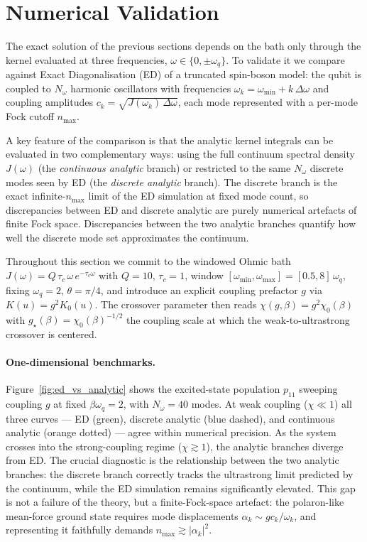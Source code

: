 \section{Numerical Validation}
\label{sec:numerical_results_v2}

The exact solution of the previous sections depends on the bath only through
the kernel evaluated at three frequencies, $\omega \in \{0, \pm\omega_q\}$.
To validate it we compare against Exact Diagonalisation (ED) of a truncated
spin-boson model: the qubit is coupled to $N_\omega$ harmonic oscillators with
frequencies $\omega_k = \omega_{\min} + k\,\Delta\omega$ and coupling amplitudes
$c_k = \sqrt{J(\omega_k)\,\Delta\omega}$, each mode represented with a per-mode
Fock cutoff $n_{\max}$.

A key feature of the comparison is that the analytic kernel integrals can be
evaluated in two complementary ways: using the full continuum spectral density
$J(\omega)$ (the \emph{continuous analytic} branch) or restricted to the same
$N_\omega$ discrete modes seen by ED (the \emph{discrete analytic} branch).
The discrete branch is the exact infinite-$n_{\max}$ limit of the ED simulation
at fixed mode count, so discrepancies between ED and discrete analytic are
purely numerical artefacts of finite Fock space.  Discrepancies between the
two analytic branches quantify how well the discrete mode set approximates the
continuum.

Throughout this section we commit to the windowed Ohmic bath
$J(\omega) = Q\,\tau_c\,\omega\,e^{-\tau_c\omega}$ with $Q=10$, $\tau_c=1$,
window $[\omega_{\min}, \omega_{\max}] = [0.5, 8]\,\omega_q$, fixing
$\omega_q = 2$, $\theta = \pi/4$, and introduce an explicit coupling
prefactor $g$ via $K(u) = g^2 K_0(u)$.  The crossover parameter then reads
$\chi(g,\beta) = g^2\chi_0(\beta)$ with
$g_\star(\beta) = \chi_0(\beta)^{-1/2}$ the coupling scale at which the
weak-to-ultrastrong crossover is centered.

\paragraph{One-dimensional benchmarks.}

Figure~\ref{fig:ed_vs_analytic} shows the excited-state population $p_{11}$
sweeping coupling $g$ at fixed $\beta\omega_q = 2$, with $N_\omega = 40$ modes.
At weak coupling ($\chi \ll 1$) all three curves — ED (green), discrete analytic
(blue dashed), and continuous analytic (orange dotted) — agree within numerical
precision.  As the system crosses into the strong-coupling regime ($\chi \gtrsim 1$),
the analytic branches diverge from ED.  The crucial diagnostic is the
relationship between the two analytic branches: the discrete branch correctly
tracks the ultrastrong limit predicted by the continuum, while the ED simulation
remains significantly elevated.  This gap is not a failure of the theory, but
a finite-Fock-space artefact: the polaron-like mean-force ground state requires
mode displacements $\alpha_k \sim g c_k/\omega_k$, and representing it faithfully
demands $n_{\max} \gtrsim |\alpha_k|^2$.

